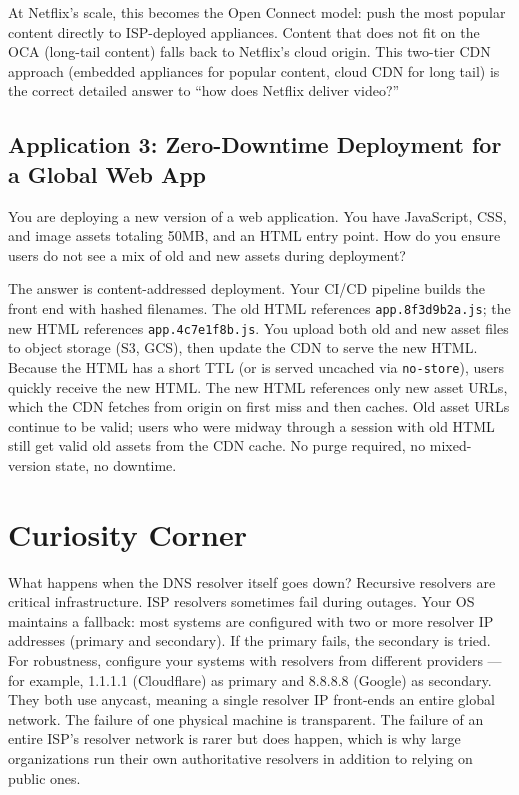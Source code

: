 \documentclass[11pt,a4paper]{article}
\begin{document}
At Netflix's scale, this becomes the Open Connect model: push the most popular content directly to ISP-deployed appliances. Content that does not fit on the OCA (long-tail content) falls back to Netflix's cloud origin. This two-tier CDN approach (embedded appliances for popular content, cloud CDN for long tail) is the correct detailed answer to ``how does Netflix deliver video?''

\subsection{Application 3: Zero-Downtime Deployment for a Global Web App}

You are deploying a new version of a web application. You have JavaScript, CSS, and image assets totaling 50MB, and an HTML entry point. How do you ensure users do not see a mix of old and new assets during deployment?

The answer is content-addressed deployment. Your CI/CD pipeline builds the front end with hashed filenames. The old HTML references \texttt{app.8f3d9b2a.js}; the new HTML references \texttt{app.4c7e1f8b.js}. You upload both old and new asset files to object storage (S3, GCS), then update the CDN to serve the new HTML. Because the HTML has a short TTL (or is served uncached via \texttt{no-store}), users quickly receive the new HTML. The new HTML references only new asset URLs, which the CDN fetches from origin on first miss and then caches. Old asset URLs continue to be valid; users who were midway through a session with old HTML still get valid old assets from the CDN cache. No purge required, no mixed-version state, no downtime.

\section{Curiosity Corner}

\begin{curiobox}{What happens when the DNS resolver itself goes down?}
Recursive resolvers are critical infrastructure. ISP resolvers sometimes fail during outages. Your OS maintains a fallback: most systems are configured with two or more resolver IP addresses (primary and secondary). If the primary fails, the secondary is tried. For robustness, configure your systems with resolvers from different providers --- for example, 1.1.1.1 (Cloudflare) as primary and 8.8.8.8 (Google) as secondary. They both use anycast, meaning a single resolver IP front-ends an entire global network. The failure of one physical machine is transparent. The failure of an entire ISP's resolver network is rarer but does happen, which is why large organizations run their own authoritative resolvers in addition to relying on public ones.
\end{curiobox}
\end{document}
